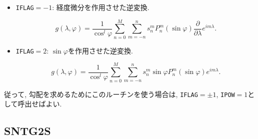 \documentclass[a4j,fleqn]{jarticle}
\begin{document}
\begin{enumerate}
\begin{itemize}
\begin{itemize}
    \item {\tt IFLAG}$=-1$: 経度微分を作用させた逆変換.

      \begin{equation}
        g(\lambda,\varphi)=\frac1{\cos^l\varphi}\sum^M_{n=0}\sum^n_{m=-n}
        s^m_n P^m_n(\sin\varphi)\frac{\partial}{\partial\lambda}
        e^{im\lambda}.
      \end{equation}

      \item {\tt IFLAG}$=2$: $\sin\varphi$を作用させた逆変換.

      \begin{equation}
        g(\lambda,\varphi)=\frac1{\cos^l\varphi}\sum^M_{n=0}\sum^n_{m=-n}
        s^m_n\sin\varphi P^m_n(\sin\varphi)
        e^{im\lambda}.
      \end{equation}

  \end{itemize}
  
      従って, 勾配を求めるためにこのルーチンを使う場合は,  
  {\tt IFLAG}$=\pm 1$, {\tt IPOW}$=1$として呼出せばよい.

\end{itemize}

 

\end{enumerate}


\subsection{SNTG2S}
\end{document}
